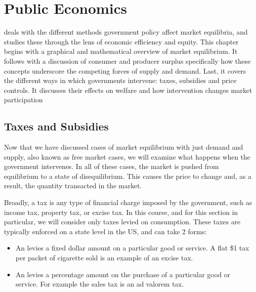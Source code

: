 \documentclass[letterpaper,10pt,english]{jupyterBook}
\begin{document}
\section{Public Economics}
\label{\detokenize{content/03-public/index:public-economics}}\label{\detokenize{content/03-public/index::doc}}
\sphinxAtStartPar
{} deals with the different methods government policy affect market equilibria, and studies these through the lens of economic efficiency and equity. This chapter begins with a graphical and mathematical overview of market equilibrium. It follows with a discussion of consumer and producer surplus \sphinxhyphen{} specifically how these concepts underscore the competing forces of supply and demand. Last, it covers the different ways in which governments intervene: taxes, subsidies and price controls. It discusses their effects on welfare and how intervention changes market participation


\subsection{Taxes and Subsidies}
\label{\detokenize{content/03-public/taxes-subsidies:taxes-and-subsidies}}\label{\detokenize{content/03-public/taxes-subsidies::doc}}
\sphinxAtStartPar
Now that we have discussed cases of market equilibrium with just demand and supply, also known as free market cases, we will examine what happens when the government intervenes. In all of these cases, the market is pushed from equilibrium to a state of disequilibrium. This causes the price to change and, as a result, the quantity transacted in the market.

\sphinxAtStartPar
Broadly, a tax is any type of financial charge imposed by the government, such as income tax, property tax, or excise tax. In this course, and for this section in particular, we will consider only taxes levied on consumption. These taxes are typically enforced on a state level in the US, and can take 2 forms:
\begin{itemize}
\item {} 
\sphinxAtStartPar
An  levies a fixed dollar amount on a particular good or service. A flat \$1 tax per packet of cigarette sold is an example of an excise tax.

\item {} 
\sphinxAtStartPar
An  levies a percentage amount on the purchase of a particular good or service. For example the sales tax is an ad valorem tax.

\end{itemize}
\end{document}
